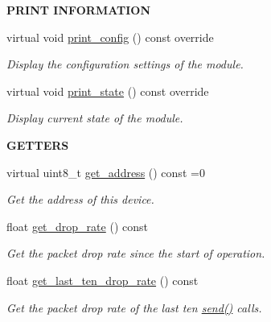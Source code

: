 \begin{Indent}{\bf P\+R\+I\+NT I\+N\+F\+O\+R\+M\+A\+T\+I\+ON}\par
\begin{DoxyCompactItemize}
\item 
virtual void \hyperlink{class_loom_comm_plat_a97982022b7e279d4def0246e17a95d61}{print\+\_\+config} () const override
\begin{DoxyCompactList}\small\item\em Display the configuration settings of the module. \end{DoxyCompactList}\item 
virtual void \hyperlink{class_loom_comm_plat_a2a3336599f8b56c2cbb223a386d797ec}{print\+\_\+state} () const override
\begin{DoxyCompactList}\small\item\em Display current state of the module. \end{DoxyCompactList}\end{DoxyCompactItemize}
\end{Indent}
\begin{Indent}{\bf G\+E\+T\+T\+E\+RS}\par
\begin{DoxyCompactItemize}
\item 
virtual uint8\+\_\+t \hyperlink{class_loom_comm_plat_afaf204bcf88cb88102cea8c6c1d745f3}{get\+\_\+address} () const =0
\begin{DoxyCompactList}\small\item\em Get the address of this device. \end{DoxyCompactList}\item 
float \hyperlink{class_loom_comm_plat_ad55b5a20b503ea93789159f075677d9f}{get\+\_\+drop\+\_\+rate} () const 
\begin{DoxyCompactList}\small\item\em Get the packet drop rate since the start of operation. \end{DoxyCompactList}\item 
float \hyperlink{class_loom_comm_plat_a5c21c70637e43f0731d97173b59200cf}{get\+\_\+last\+\_\+ten\+\_\+drop\+\_\+rate} () const 
\begin{DoxyCompactList}\small\item\em Get the packet drop rate of the last ten \hyperlink{class_loom_comm_plat_a503a10dbf3add366f1cd3bf4c274f907}{send()} calls. \end{DoxyCompactList}\end{DoxyCompactItemize}
\end{Indent}
